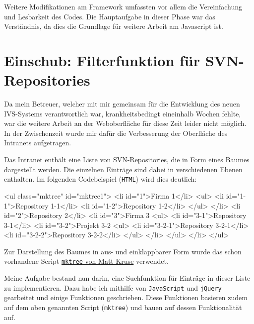 \documentclass[xcolor=dvipsnames,11pt,paper=a4paper]{report}
\begin{document}
Weitere Modifikationen am Framework umfassten vor allem die Vereinfachung und Lesbarkeit
des Codes. Die Hauptaufgabe in dieser Phase war das Verständnis, da dies die Grundlage
für weitere Arbeit am Javascript ist.



\section{Einschub: Filterfunktion für SVN-Repositories}
\label{sec:svn}

Da mein Betreuer, welcher mit mir gemeinsam für die Entwicklung des neuen IVS-Systems
verantwortlich war, krankheitsbedingt eineinhalb Wochen fehlte, war die weitere
Arbeit an der Weboberfläche für diese Zeit leider nicht möglich. In der Zwischenzeit
wurde mir dafür die Verbesserung der Oberfläche des Intranets aufgetragen.

Das Intranet enthält eine Liste von SVN-Repositories, die in Form eines Baumes dargestellt
werden. Die einzelnen Einträge sind dabei in verschiedenen Ebenen enthalten. Im
folgenden Codebeispiel (\texttt{HTML}) wird dies deutlich:

\begin{code}[language=html, caption={Beispielcode zu den SVN-Repositories im Intranet}, label={lst:svn-html-beispiel}]
<ul class="mktree" id="mktree1">
	<li id="1">Firma 1</li>
		<ul>
			<li id="1-1">Repository 1-1</li>
			<li id="1-2">Repository 1-2</li>
		</ul>
	</li>
	<li id="2">Repository 2</li>
	<li id="3">Firma 3
		<ul>
			<li id="3-1">Repository 3-1</li>
			<li id="3-2">Projekt 3-2
				<ul>
					<li id="3-2-1">Repository 3-2-1</li>
					<li id="3-2-2">Repository 3-2-2</li>
				</ul>
			</li>
		</ul>
	</li>
</ul>
\end{code}

Zur Darstellung des Baumes in aus- und einklappbarer Form wurde das schon vorhandene
Script \href{http://www.mattkruse.com/javascript/mktree}{\texttt{mktree} von
Matt Kruse} verwendet.

Meine Aufgabe bestand nun darin, eine Suchfunktion für Einträge in dieser Liste
zu implementieren. Dazu habe ich mithilfe von \texttt{JavaScript} und \texttt{jQuery}
gearbeitet und einige Funktionen geschrieben. Diese Funktionen basieren zudem auf
dem oben genannten Script (\texttt{mktree}) und bauen auf dessen Funktionalität
auf.
\end{document}
